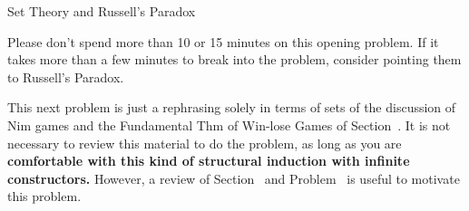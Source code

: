 \documentclass[handout]{mcs}
\begin{document}

\begin{staffnotes}
Set Theory and Russell's Paradox
\end{staffnotes}





\begin{staffnotes}
  Please don't spend more than 10 or 15 minutes on this opening problem. If it takes more than a few minutes to break into the problem, consider pointing them to Russell's Paradox.
\end{staffnotes}






\begin{staffnotes}
This next problem is just a rephrasing solely in terms of sets of the
discussion of Nim games and the Fundamental Thm of Win-lose Games of
Section~.  It is not necessary to review this
material to do the problem, as long as you are \textbf{comfortable
  with this kind of structural induction with infinite constructors.}
However, a review of Section~ and
Problem~ is useful to motivate this problem.
\end{staffnotes}











\end{document}

